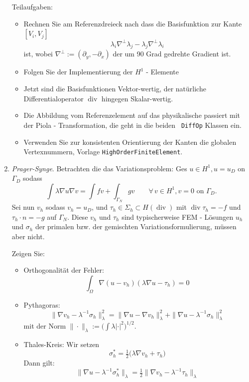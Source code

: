 \documentclass[11pt,a4paper]{report}
\begin{document}
\begin{enumerate}
  Teilaufgaben:
  \begin{itemize}
  \item Rechnen Sie am Referenzdreieck nach dass die Basisfunktion
    zur Kante $[V_i, V_j]$ 
  $$
  \lambda_i \nabla^\bot \lambda_j - \lambda_j \nabla^\bot \lambda_i
  $$
  ist, wobei $\nabla^\bot := (\partial_y, -\partial_x)$ der um 90 Grad
  gedrehte Gradient ist.
  \item Folgen Sie der Implementierung der $H^1$ - Elemente
    \item Jetzt sind die Basisfunktionen Vektor-wertig, der
      nat\"urliche Differentialoperator $\operatorname{div}$ hingegen
      Skalar-wertig.
    \item Die Abbildung vom Referenzelement auf das physikalische
      passiert mit der Piola - Transformation, die geht in die beiden {\tt
        DiffOp} Klassen ein.
    \item Verwenden Sie zur konsistenten Orientierung der Kanten die
      globalen Vertexnummern, Vorlage {\tt HighOrderFiniteElement}.
    \end{itemize}

  \item {\it Prager-Synge}. Betrachten die das Variationsproblem: Ges
    $u \in H^1, u = u_D$ on $\Gamma_D$ sodass
    $$
    \int \lambda \nabla u \nabla v = \int f v + \int_{\Gamma_N} g v \qquad \forall \, v \in
    H^1, v = 0 \text{ on } \Gamma_D.
    $$
    Sei nun $v_h$ sodass $v_h = u_D$, und $\tau_h \in \Sigma_h
    \subset H(\operatorname{div})$ mit $\operatorname{div} \tau_h = -f$ und $\tau_h
    \cdot n = -g$ auf $\Gamma_N$. Diese $v_h$ und $\tau_h$ sind typischerweise
    FEM - L\"osungen $u_h$ und $\sigma_h$ der primalen bzw. der
    gemischten Variationsformulierung, m\"ussen aber nicht.

    Zeigen Sie:
    \begin{itemize}
      \item Orthogonalit\"at der Fehler:
        $$
        \int_\Omega  \nabla (u - v_h) (\lambda \nabla u - \tau_h) = 0
        $$
      \item Pythagoras:
        $$
        \|  \nabla v_h  - \lambda^{-1} \sigma_h  \|_\lambda^2 =
        \| \nabla u - \nabla v_h \|_\lambda^2 +
        \| \nabla u - \lambda^{-1} \sigma_h  \|_\lambda^2 
        $$
        mit der Norm $\| \cdot \|_\lambda := \big( \int \lambda |
        \cdot |^2
        \big) ^{1/2}$.

      \item Thales-Kreis:
        Wir setzen
        $$
        \sigma_h^\ast = \tfrac{1}{2} \big( \lambda \nabla v_h + \tau_h \big)
        $$
        Dann gilt:
        $$
        \| \nabla u - \lambda^{-1} \sigma_h^\ast \|_\lambda = \tfrac{1}{2} \|
        \nabla v_h - \lambda^{-1} \tau_h \|_\lambda
        $$
      \end{itemize}


\end{enumerate}
\end{document}

